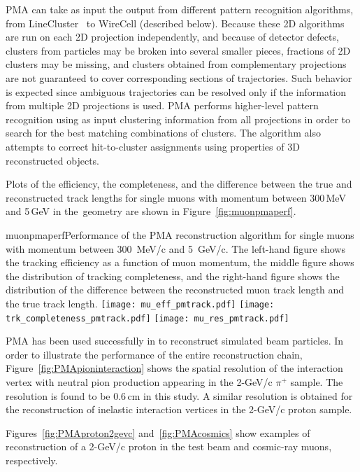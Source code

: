 PMA can take as input the output from different pattern recognition algorithms, from
LineCluster~\cite{linecluster} to WireCell (described below).  Because these 2D algorithms
are run on each 2D projection independently, and because of detector defects,
clusters from  particles may be broken
into several smaller pieces, fractions of 2D clusters may be missing,
and clusters obtained from complementary projections are not guaranteed to cover corresponding
sections of trajectories. Such behavior is expected since ambiguous 
trajectories can be resolved only if the information from multiple 2D projections is used.
PMA performs higher-level pattern recognition using as input clustering information from all
projections in order to search for the best matching combinations of clusters. The algorithm
also attempts to correct hit-to-cluster assignments using properties of 3D reconstructed objects.

Plots of the efficiency, the completeness, and the  difference between the true and reconstructed
track lengths for single muons with momentum between 300\,MeV and 5\,GeV in the~\pdsp geometry are
shown in Figure~\ref{fig:muonpmaperf}.  

\begin{cdrfigure}{muonpmaperf}{Performance of the PMA reconstruction algorithm for single muons with 
momentum between 300~MeV/c and 5~GeV/c.  The left-hand figure shows the tracking efficiency as a function of
muon momentum, the middle figure shows the distribution of tracking completeness, and the right-hand figure shows the
distribution of the difference between the reconstructed muon track length and the true track length.}
\texttt{[image: mu\_eff\_pmtrack.pdf]}
\texttt{[image: trk\_completeness\_pmtrack.pdf]}
\texttt{[image: mu\_res\_pmtrack.pdf]}
\end{cdrfigure}

PMA has been used successfully in \pdsp to reconstruct simulated beam particles. In order to illustrate the performance of the entire reconstruction chain,
Figure~\ref{fig:PMApioninteraction} shows the spatial resolution of the interaction vertex with neutral pion
production appearing in the 2-GeV/c $\pi^+$ sample.
The resolution is found to be 0.6\,cm in this study.
A similar resolution is obtained for the reconstruction
of inelastic interaction vertices in the 2-GeV/c proton sample. 


Figures~\ref{fig:PMAproton2gevc}
and~\ref{fig:PMAcosmics} show examples of reconstruction of a 2-GeV/c proton in the test beam and
cosmic-ray muons, respectively.

